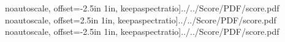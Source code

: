 \documentclass[12pt]{article}
\begin{document}
 noautoscale, offset=-2.5in 1in, keepaspectratio]{../../Score/PDF/score.pdf}
 noautoscale, offset=2.5in 1in, keepaspectratio]{../../Score/PDF/score.pdf}
 noautoscale, offset=-2.5in 1in, keepaspectratio]{../../Score/PDF/score.pdf}
\end{document}

